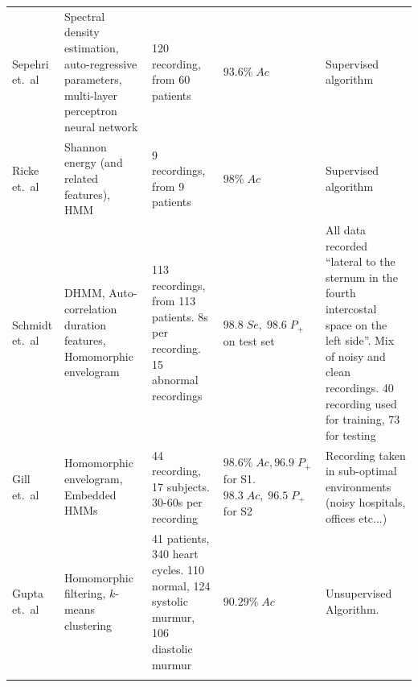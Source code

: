\documentclass[titlepage, 12pt]{scrartcl} \usepackage{enumitem}
\newcommand{\dbottomrule}{\specialrule{1pt}{0pt}{1.4pt}%
            \specialrule{1pt}{0pt}{\belowrulesep}%
            }
\begin{document}
\begin{landscape}
\begin{table}[htbp]
\begin{tabulary}{\linewidth}{LLLLL}
Sepehri et.\ al \citeyearpar{Sepehri2010}        & Spectral density estimation, auto-regressive parameters, multi-layer perceptron neural network & 120 recording, from 60 patients                                                       & $93.6\%\;Ac$                                           & Supervised algorithm                                                                                                                                                             \\
Ricke et.\ al \citeyearpar{Ricke2005}    & Shannon energy (and related features), HMM                                                     & 9 recordings, from 9 patients                                                         & $98\%\;Ac$                                             & Supervised algorithm                                                                                                                                                             \\
Schmidt et.\ al \citeyearpar{Schmidt2015}  & DHMM, Auto-correlation duration features, Homomorphic envelogram                               & 113 recordings, from 113 patients. 8s per recording. 15 abnormal recordings           & $98.8\;Se,\;98.6\;P_+$ on test set                         & All data recorded ``lateral to the sternum in the fourth intercostal space on the left side''. Mix of noisy and clean recordings. 40 recording used for training, 73 for testing \\
Gill et.\ al \citeyearpar{Gill2005}         & Homomorphic envelogram, Embedded HMMs                                                          & 44 recording, 17 subjects. 30-60s per recording                                       & $98.6\%\;Ac, 96.9\;P_+$ for S1. $98.3\;Ac,\;96.5\;P_+$ for S2 & Recording taken in sub-optimal environments (noisy hospitals, offices etc...)                                                                                                    \\
Gupta et.\ al \citeyearpar{Gupta2007}    & Homomorphic filtering, $k$-means clustering                                                       & 41 patients, 340 heart cycles. 110 normal,  124 systolic murmur, 106 diastolic murmur & $90.29\%\;Ac$                                          & Unsupervised Algorithm.                                                                                                                                                          \\ \hline
\dbottomrule\\
\end{tabulary}
\end{table}
\end{landscape}
\restoregeometry
\end{document}
